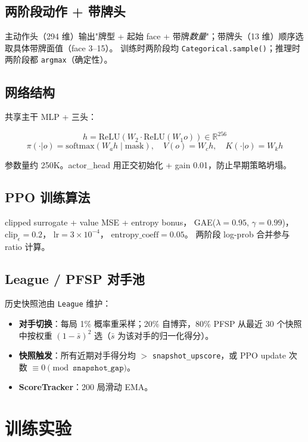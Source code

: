\documentclass[twocolumn,a4paper,10pt]{ctexart}
\begin{document}
\subsection{两阶段动作 + 带牌头}

主动作头（294 维）输出"牌型 + 起始 face + 带牌\emph{数量}"；带牌头（13 维）顺序选取具体带牌面值（face 3--15）。
训练时两阶段均 \texttt{Categorical.sample()}；推理时两阶段都 \texttt{argmax}（确定性）。

\subsection{网络结构}

共享主干 MLP + 三头：

$$ h = \text{ReLU}(W_2 \cdot \text{ReLU}(W_1 o)) \in \mathbb{R}^{256} $$
$$ \pi(\cdot|o) = \text{softmax}(W_a h \mid \text{mask}), \quad V(o) = W_c h, \quad K(\cdot|o) = W_k h $$

参数量约 250K。actor\_head 用正交初始化 + gain 0.01，防止早期策略坍塌。

\subsection{PPO 训练算法}

clipped surrogate + value MSE + entropy bonus，
GAE($\lambda=0.95$, $\gamma=0.99$)，
$\text{clip}_\epsilon=0.2$，
$\text{lr} = 3 \times 10^{-4}$，
$\text{entropy\_coeff} = 0.05$。
两阶段 log-prob 合并参与 ratio 计算。

\subsection{League / PFSP 对手池}

历史快照池由 \texttt{League} 维护：
\begin{itemize}[nosep,leftmargin=1.2em]
\item \textbf{对手切换}：每局 1\% 概率重采样；20\% 自博弈，80\% PFSP 从最近 30 个快照中按权重 $(1-\bar{s})^2$ 选（$\bar{s}$ 为该对手的归一化得分）。
\item \textbf{快照触发}：所有近期对手得分均 $>$ \texttt{snapshot\_upscore}，或 PPO update 次数 $\equiv 0 \pmod{\texttt{snapshot\_gap}}$。
\item \textbf{ScoreTracker}：200 局滑动 EMA。
\end{itemize}

\section{训练实验}
\end{document}
